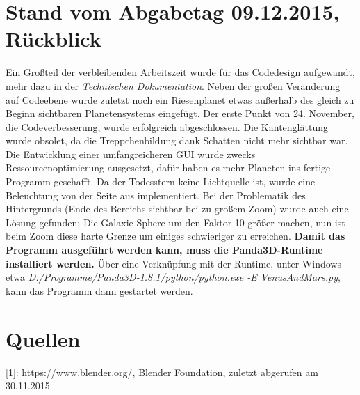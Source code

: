 \documentclass[12pt,a4paper,oneside,ngerman]{scrartcl}
\begin{document}
\section{Stand vom Abgabetag 09.12.2015, Rückblick}
Ein Großteil der verbleibenden Arbeitszeit wurde für das Codedesign aufgewandt, mehr dazu in der \textit{Technischen Dokumentation}. Neben der großen Veränderung auf Codeebene wurde zuletzt noch ein Riesenplanet etwas außerhalb des gleich zu Beginn sichtbaren Planetensystems eingefügt. \newline
Der erste Punkt von 24. November, die Codeverbesserung, wurde erfolgreich abgeschlossen. Die Kantenglättung wurde obsolet, da die Treppchenbildung dank Schatten nicht mehr sichtbar war. Die Entwicklung einer umfangreicheren GUI wurde zwecks Ressourcenoptimierung ausgesetzt, dafür haben es mehr Planeten ins fertige Programm geschafft. Da der Todesstern keine Lichtquelle ist, wurde eine Beleuchtung von der Seite aus implementiert. Bei der Problematik des Hintergrunds (Ende des Bereichs sichtbar bei zu großem Zoom) wurde auch eine Lösung gefunden: Die Galaxie-Sphere um den Faktor 10 größer machen, nun ist beim Zoom diese harte Grenze um einiges schwieriger zu erreichen. \newline \newline
\textbf{Damit das Programm ausgeführt werden kann, muss die Panda3D-Runtime installiert werden.} \newline
Über eine Verknüpfung mit der Runtime, unter Windows etwa \textit{D:/Programme/Panda3D-1.8.1/python/python.exe -E VenusAndMars.py}, kann das Programm dann gestartet werden.


\newpage

\section{Quellen}
[1]: https://www.blender.org/, Blender Foundation, zuletzt abgerufen am 30.11.2015 \newline

\end{document}
